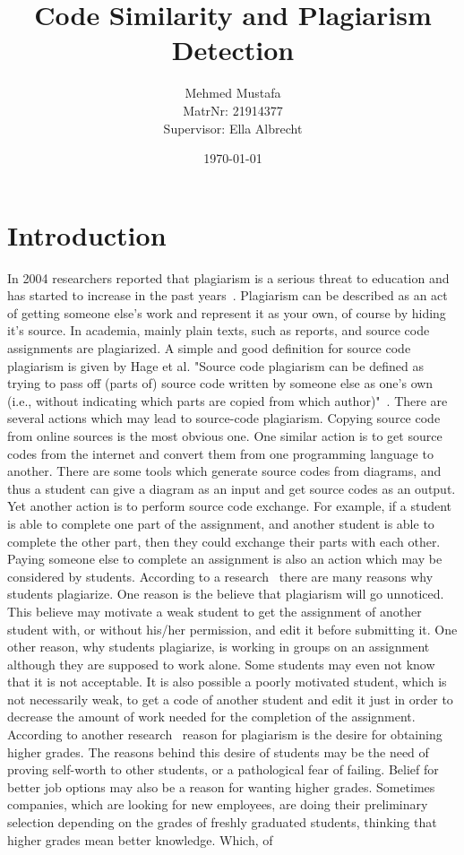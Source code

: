 \documentclass[12pt]{article}
\title{Code Similarity and Plagiarism Detection}
\date{\today}
\author{Mehmed Mustafa \\
		MatrNr: 21914377 \\
		Supervisor: Ella Albrecht}
\begin{document}
\maketitle
\thispagestyle{empty}
\newpage
\tableofcontents

\newpage
{}
\section{Introduction} \label{sec:Introduction}
In 2004 researchers reported that plagiarism is a serious threat to education and has started to increase in the past years~\cite{plagEduIncr}. Plagiarism can be described as an act of getting someone else's work and represent it as your own, of course by hiding it's source. In academia, mainly plain texts, such as reports, and source code assignments are plagiarized. A simple and good definition for source code plagiarism is given by Hage et al. "Source code plagiarism can be defined as trying to pass off (parts of) source code written by someone else as one's own (i.e., without indicating which parts are copied from which author)"~\cite{definitionSCP}. There are several actions which may lead to source-code plagiarism. Copying source code from online sources is the most obvious one. One similar action is to get source codes from the internet and convert them from one programming language to another. There are some tools which generate source codes from diagrams, and thus a student can give a diagram as an input and get source codes as an output. Yet another action is to perform source code exchange. For example, if a student is able to complete one part of the assignment, and another student is able to complete the other part, then they could exchange their parts with each other. Paying someone else to complete an assignment is also an action which may be considered by students. According to a research~\cite{schiller} there are many reasons why students plagiarize. One reason is the believe that plagiarism will go unnoticed. This believe may motivate a weak student to get the assignment of another student with, or without his/her permission, and edit it before submitting it. One other reason, why students plagiarize, is working in groups on an assignment although they are supposed to work alone. Some students may even not know that it is not acceptable. It is also possible a poorly motivated student, which is not necessarily weak, to get a code of another student and edit it just in order to decrease the amount of work needed for the completion of the assignment. According to another research~\cite{bennett} reason for plagiarism is the desire for obtaining higher grades. The reasons behind this desire of students may be the need of proving self-worth to other students, or a pathological fear of failing. Belief for better job options may also be a reason for wanting higher grades. Sometimes companies, which are looking for new employees, are doing their preliminary selection depending on the grades of freshly graduated students, thinking that higher grades mean better knowledge. Which, of 
\end{document}
